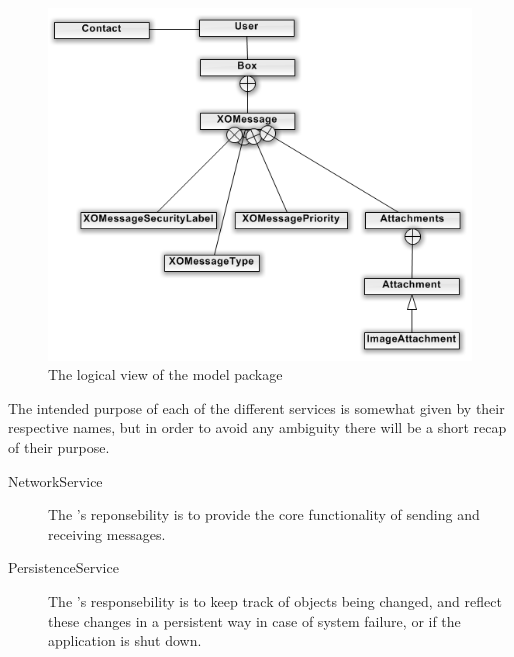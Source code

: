 \begin{figure}[H]
	\includegraphics[width=\textwidth]{modelPackage.png}
	\caption{The logical view of the model package}
	\label{fig:logicalmodelpackview}
\end{figure}

The intended purpose of each of the different services is somewhat given by their respective names, but in order to avoid any ambiguity there will be a short recap of their purpose.
\begin{description}
	\item[NetworkService] The 's reponsebility is to provide the core functionality of sending and receiving messages. 
	\item[PersistenceService] The 's responsebility is to keep track of objects being changed, and reflect these changes in a persistent way in case of system failure, or if the application is shut down. 
\end{description}

